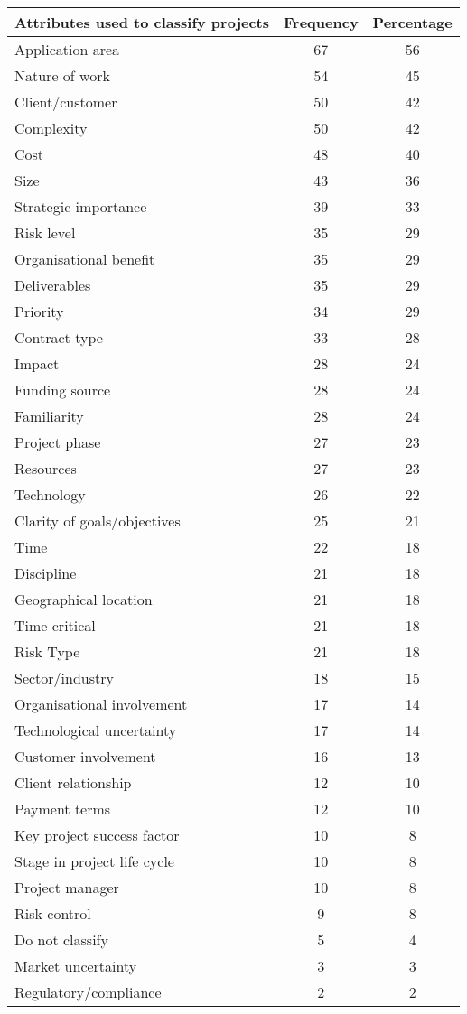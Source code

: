 \begin{table}[!htb]
\captionsetup{font=small}
\centering
\footnotesize
    \begin{tabular}{| l | c | c |}
    \hline
    {\bf Attributes used to classify projects} & {\bf Frequency} & {\bf Percentage} \\
    \hline
    Application area & 67 & 56 \\
    Nature of work & 54 & 45 \\
    Client/customer & 50 & 42 \\
    Complexity & 50 & 42 \\
    Cost & 48 & 40  \\
    Size & 43 & 36 \\
    Strategic importance & 39 & 33 \\
    Risk level & 35 & 29 \\
    Organisational benefit & 35 & 29 \\
    Deliverables & 35 & 29 \\
    Priority & 34 & 29 \\
    Contract type & 33 & 28 \\
    Impact & 28 & 24 \\
    Funding source & 28 & 24 \\
    Familiarity & 28 & 24 \\
    Project phase & 27 & 23 \\
    Resources & 27 & 23 \\
    Technology & 26 & 22 \\
    Clarity of goals/objectives & 25 & 21 \\
    Time & 22 & 18 \\
    Discipline & 21 & 18 \\
    Geographical location & 21 & 18\\
    Time critical & 21 & 18 \\
    Risk Type & 21 & 18 \\
    Sector/industry & 18 & 15 \\
    Organisational involvement & 17 & 14\\
    Technological uncertainty & 17 & 14 \\
    Customer involvement & 16 & 13 \\
    Client relationship & 12 & 10 \\
    Payment terms & 12 & 10 \\
    Key project success factor & 10 & 8 \\
    Stage in project life cycle & 10 & 8 \\
    Project manager & 10 & 8 \\
    Risk control & 9 & 8 \\
    Do not classify & 5 & 4\\
    Market uncertainty & 3 & 3 \\
    Regulatory/compliance & 2 & 2\\
     \hline 
    \end{tabular}
    

\end{table}
